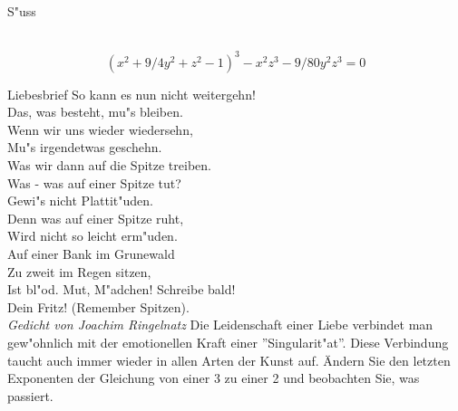 \documentclass[de]{./../../common/SurferDesc}%
\begin{document}
\footnotesize


\begin{surferPage}
  \begin{surferTitle}S"uss\end{surferTitle}   \\

\smallskip
\[(x^2+ 9/4y^2	+ z^2- 1)^3- x^2z^3	- 9/80y^2z^3	= 0\]

\singlespacing
Liebesbrief
\singlespacing
So kann es nun nicht weitergehn! \\
Das, was besteht, mu"s bleiben. \\
Wenn wir uns wieder wiedersehn, \\
Mu"s irgendetwas geschehn. \\
Was wir dann auf die Spitze treiben.\\ 
Was - was auf einer Spitze tut? \\
Gewi"s nicht Plattit"uden. \\
Denn was auf einer Spitze ruht, \\
Wird nicht so leicht erm"uden. \\
Auf einer Bank im Grunewald \\
Zu zweit im Regen sitzen, \\
Ist bl"od. Mut, M"adchen! Schreibe bald! \\
Dein Fritz! (Remember Spitzen). \\
 {\it Gedicht von Joachim Ringelnatz}
\singlespacing 
Die Leidenschaft einer Liebe verbindet man gew"ohnlich mit der emotionellen Kraft einer ''Singularit"at''. Diese Verbindung taucht auch immer wieder in allen Arten der Kunst auf.
\singlespacing 
\"Andern Sie den letzten Exponenten der Gleichung von einer 3 zu einer 2 und beobachten Sie, was passiert.



  \begin{surferText}
     \end{surferText}
\end{surferPage}
\end{document}
